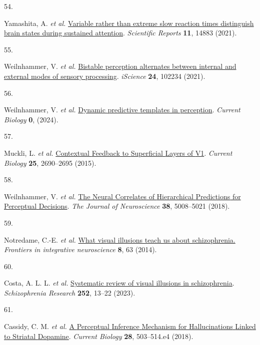 \documentclass[
]{article}
\newlength{\cslhangindent}
\newlength{\csllabelwidth}
\newenvironment{CSLReferences}[2] %
 {\begin{list}{}{%
  \setlength{\itemindent}{0pt}
  \setlength{\leftmargin}{0pt}
  \setlength{\parsep}{0pt}
  \ifodd #1
   \setlength{\leftmargin}{\cslhangindent}
   \setlength{\itemindent}{-1\cslhangindent}
  \fi
  \setlength{\itemsep}{#2\baselineskip}}}
 {\end{list}}
\newcommand{\CSLLeftMargin}[1]{\parbox[t]{\csllabelwidth}{\strut#1\strut}}
\newcommand{\CSLRightInline}[1]{\parbox[t]{\linewidth - \csllabelwidth}{\strut#1\strut}}
\begin{document}
\begin{CSLReferences}{0}{0}
\CSLLeftMargin{54. }%
\CSLRightInline{Yamashita, A. \emph{et al.}
\href{https://doi.org/10.1038/s41598-021-94161-0}{Variable rather than
extreme slow reaction times distinguish brain states during sustained
attention}. \emph{Scientific Reports} \textbf{11}, 14883 (2021).}

\CSLLeftMargin{55. }%
\CSLRightInline{Weilnhammer, V. \emph{et al.}
\href{https://doi.org/10.1016/j.isci.2021.102234}{Bistable perception
alternates between internal and external modes of sensory processing}.
\emph{iScience} \textbf{24}, 102234 (2021).}

\CSLLeftMargin{56. }%
\CSLRightInline{Weilnhammer, V. \emph{et al.}
\href{https://doi.org/10.1016/j.cub.2024.07.087}{Dynamic predictive
templates in perception}. \emph{Current Biology} \textbf{0}, (2024).}

\CSLLeftMargin{57. }%
\CSLRightInline{Muckli, L. \emph{et al.}
\href{https://doi.org/10.1016/j.cub.2015.08.057}{Contextual {Feedback}
to {Superficial} {Layers} of {V1}}. \emph{Current Biology} \textbf{25},
2690--2695 (2015).}

\CSLLeftMargin{58. }%
\CSLRightInline{Weilnhammer, V. \emph{et al.}
\href{https://doi.org/10.1523/JNEUROSCI.2901-17.2018}{The {Neural}
{Correlates} of {Hierarchical} {Predictions} for {Perceptual}
{Decisions}}. \emph{The Journal of Neuroscience} \textbf{38}, 5008--5021
(2018).}

\CSLLeftMargin{59. }%
\CSLRightInline{Notredame, C.-E. \emph{et al.}
\href{https://doi.org/10.3389/fnint.2014.00063}{What visual illusions
teach us about schizophrenia.} \emph{Frontiers in integrative
neuroscience} \textbf{8}, 63 (2014).}

\CSLLeftMargin{60. }%
\CSLRightInline{Costa, A. L. L. \emph{et al.}
\href{https://doi.org/10.1016/j.schres.2022.12.030}{Systematic review of
visual illusions in schizophrenia}. \emph{Schizophrenia Research}
\textbf{252}, 13--22 (2023).}

\CSLLeftMargin{61. }%
\CSLRightInline{Cassidy, C. M. \emph{et al.}
\href{https://doi.org/10.1016/j.cub.2017.12.059}{A {Perceptual}
{Inference} {Mechanism} for {Hallucinations} {Linked} to {Striatal}
{Dopamine}}. \emph{Current Biology} \textbf{28}, 503--514.e4 (2018).}


\end{CSLReferences}
\end{document}
